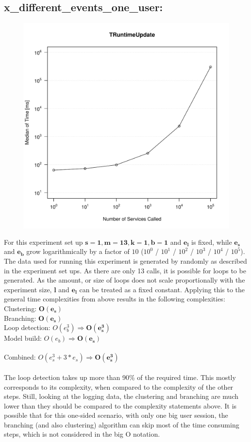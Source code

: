 \documentclass[10pt,a4paper]{article}
\begin{document}
	\subsection{x\_different\_events\_one\_user:}
	\begin{figure}[H]
		\centering
		\includegraphics[scale=0.7]{graphics/TRuntimeUpdate_median_different_events.pdf}
	\end{figure}
	For this experiment set up $\mathbf{s = 1, m = 13, k = 1, b = 1}$ and $\mathbf{e_l}$ is fixed, while $\mathbf{e_s}$ and $\mathbf{e_b}$ grow logarithmically by a factor of $10$ ($10^0$ / $10^1$ / $10^2$ / $10^3$ / $10^4$ / $10^5$). The data used for running this experiment is generated by randomly as described in the experiment set ups. As there are only 13 calls, it is possible for loops to be generated. As the amount, or size of loops does not scale proportionally with the experiment size, $\mathbf{l}$ and $\mathbf{e_l}$ can be treated as a fixed constant. Applying this to the general time complexities from above results in the following complexities:\\
	Clustering: $\mathbf{O(e_s)}$\\
	Branching: $\mathbf{O(e_s)}$\\
	Loop detection: $O(e_b^3) \Rightarrow \mathbf{O(e_s^3)}$\\
	Model build: $O(e_b) \Rightarrow \mathbf{O(e_s)}$\\
	\\
	Combined: $O(e_s^3 + 3*e_s) \Rightarrow \mathbf{O(e_s^3)}$\\
	\\
	The loop detection takes up more than 90\% of the required time. This mostly corresponds to its complexity, when compared to the complexity of the other steps. Still, looking at the logging data, the clustering and branching are much lower than they should be compared to the complexity statements above. It is possible that for this one-sided scenario, with only one big user session, the branching (and also clustering) algorithm can skip most of the time consuming steps, which is not considered in the big O notation.
\end{document}
